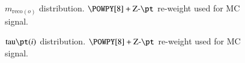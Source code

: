 \begin{figure}[h!tbp]
	\centering
	\hfill
	\caption{$m_{\text{reco}(o)}$ distribution. $\POWPY[8]+\text{Z-}\pt$ re-weight used for MC signal.}
	\label{AFig4P}
\end{figure} 

\begin{figure}[h!tbp]
	\centering
	\hfill
	\caption{$\text{tau}\pt(i)$ distribution. $\POWPY[8]+\text{Z-}\pt$ re-weight used for MC signal.}
	\label{AFig5P}
\end{figure} 

